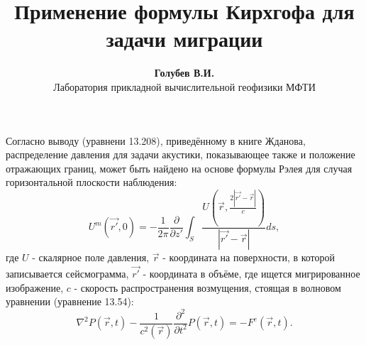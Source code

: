 \documentclass{article}
\begin{document}
\title{Применение формулы Кирхгофа для задачи миграции}
\author{\textbf{Голубев В.И.} \\ Лаборатория прикладной вычислительной геофизики МФТИ}
\maketitle
Согласно выводу (уравнени 13.208), приведённому в книге Жданова, распределение давления для
задачи акустики, показывающее также и положение отражающих границ,
может быть найдено на основе формулы Рэлея для случая горизонтальной плоскости
наблюдения:
\begin{equation}
\label{rayleigh_migration}
U^m(\vec{r'},0) = -\frac{1}{2\pi}\frac{\partial}{\partial z'}
	\int_S \frac{U(\vec{r},\frac{2|\vec{r'}-\vec{r}|}{c})}{|\vec{r'}-\vec{r}|}ds,
\end{equation}
где $U$ - скалярное поле давления, $\vec{r}$ - координата на поверхности, в которой записывается
сейсмограмма, $\vec{r'}$ - координата в объёме, где ищется мигрированное изображение, $c$ - скорость распространения возмущения, стоящая в волновом уравнении (уравнение 13.54):
\begin{equation}
\label{wave_equation}
\nabla^2P(\vec{r},t) - \frac{1}{c^2(\vec{r})}\frac{\partial^2}{\partial t^2}
	P(\vec{r},t) = - F^e(\vec{r},t).
\end{equation}
\end{document}
